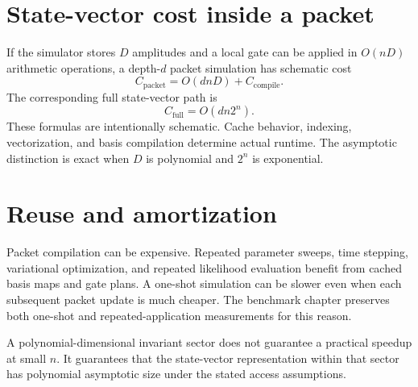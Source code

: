 \section{State-vector cost inside a packet}
If the simulator stores $D$ amplitudes and a local gate can be applied in $O(nD)$ arithmetic operations, a depth-$d$ packet simulation has schematic cost
\[
C_{\mathrm{packet}}=O(dnD)+C_{\mathrm{compile}}.
\]
The corresponding full state-vector path is
\[
C_{\mathrm{full}}=O(dn2^n).
\]
These formulas are intentionally schematic. Cache behavior, indexing, vectorization, and basis compilation determine actual runtime. The asymptotic distinction is exact when $D$ is polynomial and $2^n$ is exponential.

\section{Reuse and amortization}
Packet compilation can be expensive. Repeated parameter sweeps, time stepping, variational optimization, and repeated likelihood evaluation benefit from cached basis maps and gate plans. A one-shot simulation can be slower even when each subsequent packet update is much cheaper. The benchmark chapter preserves both one-shot and repeated-application measurements for this reason.

\begin{scopebox}
A polynomial-dimensional invariant sector does not guarantee a practical speedup at small $n$. It guarantees that the state-vector representation within that sector has polynomial asymptotic size under the stated access assumptions.
\end{scopebox}
